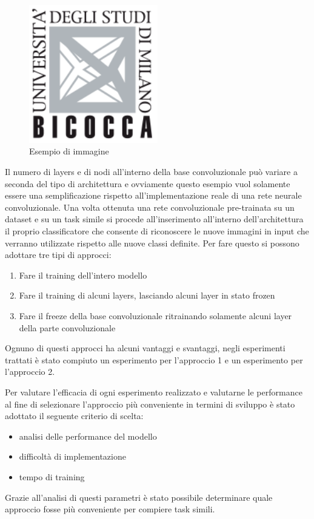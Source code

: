 \begin{figure}
    \centering
    \includegraphics[width=0.5\textwidth]{./logo.png}
    \caption{Esempio di immagine} 
    \label{fig:logo}
\end{figure}
Il numero di layers e di nodi all'interno della base convoluzionale può variare a seconda del tipo di architettura e ovviamente questo esempio vuol solamente essere una semplificazione rispetto all'implementazione reale di una rete neurale convoluzionale.  
Una volta ottenuta una rete convoluzionale pre-trainata su un dataset e su un task simile si procede all'inserimento all'interno dell'architettura il proprio classificatore che consente di riconoscere le nuove immagini in input che verranno utilizzate rispetto alle nuove classi definite.  
Per fare questo si possono adottare tre tipi di approcci:
\begin{enumerate}
\item Fare il training dell'intero modello
\item Fare il training di alcuni layers, lasciando alcuni layer in stato frozen
\item Fare il freeze della base convoluzionale ritrainando solamente alcuni layer della parte convoluzionale
\end{enumerate}
  
Ognuno di questi approcci ha alcuni vantaggi e svantaggi, negli esperimenti trattati è stato compiuto un esperimento per l'approccio 1 e un esperimento per l'approccio 2. \bigskip

Per valutare l'efficacia di ogni esperimento realizzato e valutarne le performance al fine di selezionare l'approccio più conveniente in termini di sviluppo è stato adottato il seguente criterio di scelta:  
\begin{itemize}
\item analisi delle performance del modello
\item difficoltà di implementazione
\item tempo di training
\end{itemize}
Grazie all'analisi di questi parametri è stato possibile determinare quale approccio fosse più conveniente per compiere task simili.  
\bigskip


